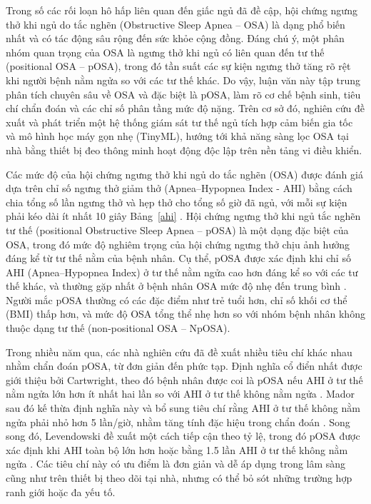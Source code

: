 Trong số các rối loạn hô hấp liên quan đến giấc ngủ đã đề cập, 
hội chứng ngưng thở khi ngủ do tắc nghẽn (Obstructive Sleep Apnea – OSA) 
là dạng phổ biến nhất và có tác động sâu rộng đến sức khỏe cộng đồng. 
Đáng chú ý, một phân nhóm quan trọng của OSA là ngưng thở khi ngủ 
có liên quan đến tư thế (positional OSA – pOSA), 
trong đó tần suất các sự kiện ngưng thở tăng rõ rệt khi người bệnh 
nằm ngửa so với các tư thế khác. 
Do vậy, luận văn này tập trung phân tích chuyên sâu về OSA và đặc biệt là pOSA, 
làm rõ cơ chế bệnh sinh, tiêu chí chẩn đoán và các chỉ số phân tầng mức độ nặng. 
Trên cơ sở đó, nghiên cứu đề xuất và phát triển một hệ thống giám sát tư thế ngủ tích hợp cảm biến gia tốc và 
mô hình học máy gọn nhẹ (TinyML), hướng tới khả năng sàng lọc OSA tại nhà bằng thiết bị đeo thông minh hoạt động độc lập trên nền tảng vi điều khiển.

Các mức độ của hội chứng ngưng thở khi ngủ do tắc nghẽn 
(OSA) được đánh giá dựa trên chỉ số ngưng thở giảm thở 
(Apnea–Hypopnea Index - AHI) bằng cách chia tổng số 
lần ngưng thở và hẹp thở cho tổng số giờ đã ngủ, 
với mỗi sự kiện phải kéo dài ít nhất 10 giây Bảng~\ref{ahi} \cite{osa_summary}. 
Hội chứng ngưng thở khi ngủ tắc nghẽn tư thế (positional Obstructive Sleep Apnea – pOSA) 
là một dạng đặc biệt của OSA, trong đó mức độ nghiêm trọng 
của hội chứng ngưng thở chịu ảnh hưởng đáng kể từ tư thế nằm của bệnh nhân. 
Cụ thể, pOSA được xác định khi chỉ số AHI (Apnea–Hypopnea Index) ở tư thế nằm ngửa cao hơn đáng kể so với các tư thế khác, 
và thường gặp nhất ở bệnh nhân OSA mức độ nhẹ đến trung bình \cite{heinzer2018,aloweidat2023positional}. 
Người mắc pOSA thường có các đặc điểm như trẻ tuổi hơn, chỉ số khối cơ thể (BMI) thấp hơn, và mức độ OSA tổng thể nhẹ hơn so với nhóm bệnh nhân không thuộc dạng tư thế (non-positional OSA – NpOSA).

Trong nhiều năm qua, các nhà nghiên cứu đã đề xuất nhiều tiêu chí 
khác nhau nhằm chẩn đoán pOSA, từ đơn giản đến phức tạp. 
Định nghĩa cổ điển nhất được giới thiệu bởi Cartwright, 
theo đó bệnh nhân được coi là pOSA nếu AHI ở tư thế nằm ngửa lớn 
hơn ít nhất hai lần so với AHI ở tư thế không nằm ngửa \cite{cartwright1984position}. 
Mador sau đó kế thừa định nghĩa này và bổ sung tiêu chí rằng 
AHI ở tư thế không nằm ngửa phải nhỏ hơn 5 lần/giờ, 
nhằm tăng tính đặc hiệu trong chẩn đoán \cite{mador2005prevalence}. 
Song song đó, Levendowski đề xuất một cách tiếp cận theo tỷ lệ, 
trong đó pOSA được xác định khi AHI toàn bộ lớn hơn hoặc bằng 1.5 lần 
AHI ở tư thế không nằm ngửa \cite{levendowski2015neck}. 
Các tiêu chí này có ưu điểm là đơn giản và dễ áp dụng trong lâm sàng 
cũng như trên thiết bị theo dõi tại nhà, 
nhưng có thể bỏ sót những trường hợp ranh giới hoặc đa yếu tố.

